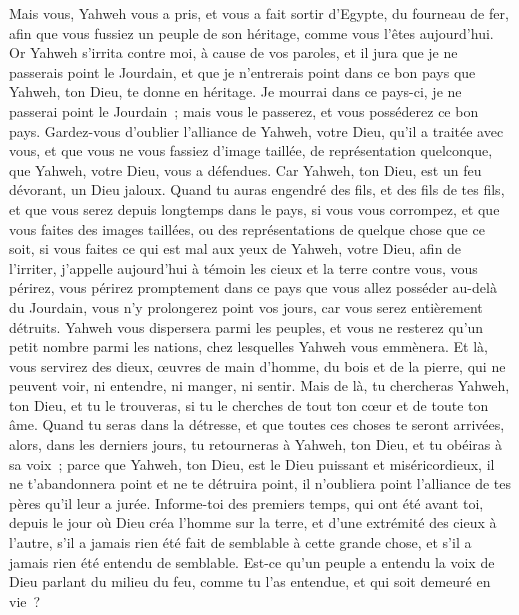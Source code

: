 \begin{multicols}{2}
Mais vous, Yahweh vous a pris, et vous a fait sortir d'Egypte, du fourneau de fer, afin que vous fussiez un peuple de son héritage, comme vous l'êtes aujourd'hui.
Or Yahweh s'irrita contre moi, à cause de vos paroles, et il jura que je ne passerais point le Jourdain, et que je n'entrerais point dans ce bon pays que Yahweh, ton Dieu, te donne en héritage.
Je mourrai dans ce pays-ci, je ne passerai point le Jourdain~; mais vous le passerez, et vous posséderez ce bon pays.
Gardez-vous d'oublier l'alliance de Yahweh, votre Dieu, qu'il a traitée avec vous, et que vous ne vous fassiez d'image taillée, de représentation quelconque, que Yahweh, votre Dieu, vous a défendues.
Car Yahweh, ton Dieu, est un feu dévorant, un Dieu jaloux.
Quand tu auras engendré des fils, et des fils de tes fils, et que vous serez depuis longtemps dans le pays, si vous vous corrompez, et que vous faites des images taillées, ou des représentations de quelque chose que ce soit, si vous faites ce qui est mal aux yeux de Yahweh, votre Dieu, afin de l'irriter,
j'appelle aujourd'hui à témoin les cieux et la terre contre vous, vous périrez, vous périrez promptement dans ce pays que vous allez posséder au-delà du Jourdain, vous n'y prolongerez point vos jours, car vous serez entièrement détruits.
Yahweh vous dispersera parmi les peuples, et vous ne resterez qu'un petit nombre parmi les nations, chez lesquelles Yahweh vous emmènera.
Et là, vous servirez des dieux, œuvres de main d'homme, du bois et de la pierre, qui ne peuvent voir, ni entendre, ni manger, ni sentir.
Mais de là, tu chercheras Yahweh, ton Dieu, et tu le trouveras, si tu le cherches de tout ton cœur et de toute ton âme.
Quand tu seras dans la détresse, et que toutes ces choses te seront arrivées, alors, dans les derniers jours, tu retourneras à Yahweh, ton Dieu, et tu obéiras à sa voix~;
parce que Yahweh, ton Dieu, est le Dieu puissant et miséricordieux, il ne t'abandonnera point et ne te détruira point, il n'oubliera point l'alliance de tes pères qu'il leur a jurée.
Informe-toi des premiers temps, qui ont été avant toi, depuis le jour où Dieu créa l'homme sur la terre, et d'une extrémité des cieux à l'autre, s'il a jamais rien été fait de semblable à cette grande chose, et s'il a jamais rien été entendu de semblable.
Est-ce qu'un peuple a entendu la voix de Dieu parlant du milieu du feu, comme tu l'as entendue, et qui soit demeuré en vie~?

\end{multicols}
